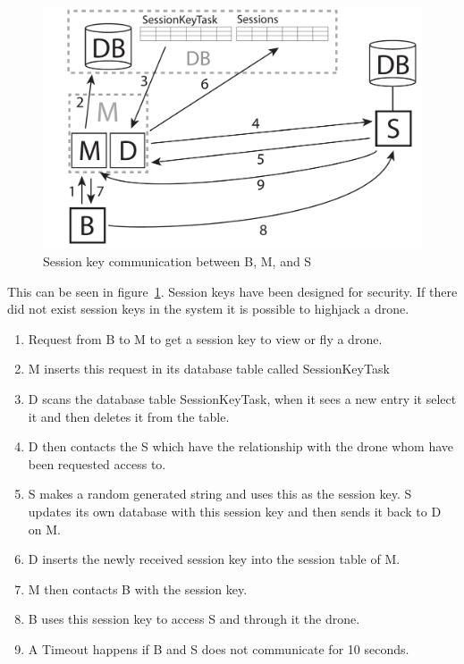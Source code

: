 \begin{figure}[htb]
    \centering 
    \includegraphics[width=\textwidth]{gfx/sessionkey_communication.pdf}
    \caption{Session key communication between B, M, and S}
    \label{fig:sessionkey_communication}
\end{figure}

This can be seen in figure~\ref{fig:sessionkey_communication}. Session keys have been designed for security. If there did not exist session keys in the system it is possible to highjack a drone.

\begin{enumerate}
	\item Request from B to M to get a session key to view or fly a drone.
	\item M inserts this request in its database table called SessionKeyTask
	\item D scans the database table SessionKeyTask, when it sees a new entry it select it and then deletes it from the table.
	\item D then contacts the S which have the relationship with the drone whom have been requested access to.
	\item S makes a random generated string and uses this as the session key. S updates its own database with this session key and then sends it back to D on M.
	\item D inserts the newly received session key into the session table of M.
	\item M then contacts B with the session key.
	\item B uses this session key to access S and through it the drone.
	\item A Timeout happens if B and S does not communicate for 10 seconds.
\end{enumerate}


